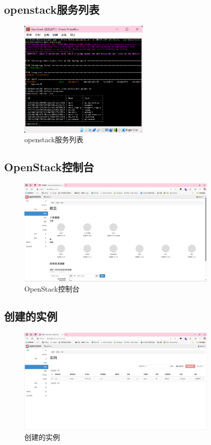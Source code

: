 \documentclass{article}
\begin{document}
\subsection{openstack服务列表}

\begin{figure}[H]
    \centering
    \includegraphics[width=0.55\textwidth]{img/7.6.png}
    \caption{openstack服务列表}
\end{figure}

\subsection{OpenStack控制台}

\begin{figure}[H]
    \centering
    \includegraphics[width=0.85\textwidth]{img/7.9.png}
    \caption{OpenStack控制台}
\end{figure}

\subsection{创建的实例}

\begin{figure}[H]
    \centering
    \includegraphics[width=0.85\textwidth]{img/11.4.png}
    \caption{创建的实例}
\end{figure}
\end{document}
